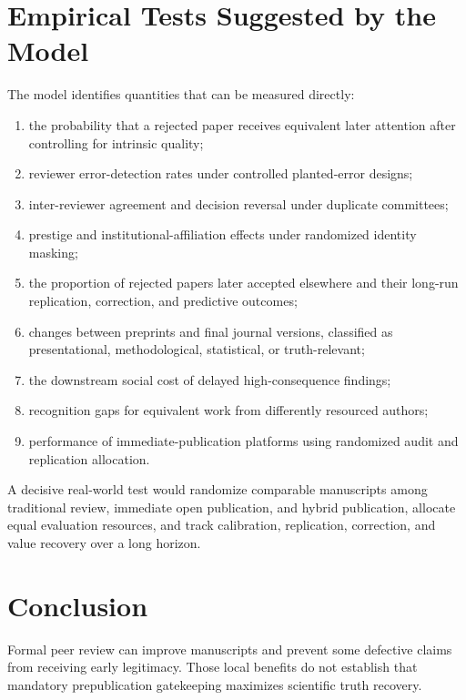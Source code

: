 \section{Empirical Tests Suggested by the Model}

The model identifies quantities that can be measured directly:

\begin{enumerate}
    \item the probability that a rejected paper receives equivalent later attention after controlling for intrinsic quality;
    \item reviewer error-detection rates under controlled planted-error designs;
    \item inter-reviewer agreement and decision reversal under duplicate committees;
    \item prestige and institutional-affiliation effects under randomized identity masking;
    \item the proportion of rejected papers later accepted elsewhere and their long-run replication, correction, and predictive outcomes;
    \item changes between preprints and final journal versions, classified as presentational, methodological, statistical, or truth-relevant;
    \item the downstream social cost of delayed high-consequence findings;
    \item recognition gaps for equivalent work from differently resourced authors;
    \item performance of immediate-publication platforms using randomized audit and replication allocation.
\end{enumerate}

A decisive real-world test would randomize comparable manuscripts among traditional review, immediate open publication, and hybrid publication, allocate equal evaluation resources, and track calibration, replication, correction, and value recovery over a long horizon.

\section{Conclusion}

Formal peer review can improve manuscripts and prevent some defective claims from receiving early legitimacy. Those local benefits do not establish that mandatory prepublication gatekeeping maximizes scientific truth recovery.

